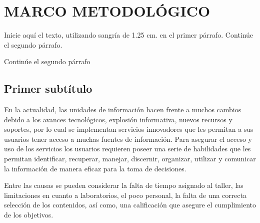 \chapter{MARCO METODOLÓGICO}

Inicie aquí el texto, utilizando sangría de 1.25 cm. en el primer
párrafo. Continúe el segundo párrafo.

Continúe el segundo párrafo

\section{Primer subtítulo}

En la actualidad, las unidades de información hacen frente a muchos cambios
debido a los avances tecnológicos, explosión informativa, nuevos recursos y
soportes, por lo cual se implementan servicios innovadores que les permitan a
sus usuarios tener acceso a muchas fuentes de información. Para asegurar el
acceso y uso de los servicios los usuarios requieren poseer una serie de
habilidades que les permitan identificar, recuperar, manejar, discernir,
organizar, utilizar y comunicar la información de manera eficaz para la toma de
decisiones.

Entre las causas se pueden considerar la falta de tiempo asignado al taller,
las limitaciones en cuanto a laboratorios, el poco personal, la falta de una
correcta selección de los contenidos, así como, una calificación que asegure el
cumplimiento de los objetivos.

